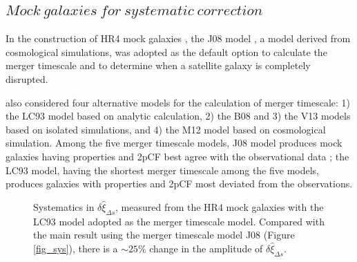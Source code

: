 \documentclass[iop]{emulateapj}
\begin{document}


\subsection{$Mock\ galaxies\ for\ systematic\ correction$}

In the construction of HR4 mock galaxies \citep{hong2016}, 
the J08 model \citep{jiang2008}, a model derived from cosmological simulations, 
was adopted as the default option to calculate the merger timescale and to determine when a satellite galaxy is completely disrupted.

\cite{hong2016} also considered four alternative models for the calculation of merger timescale:
1) the LC93 model \citep{LC93} based on analytic calculation, 
2) the B08 \citep{B08} and 3) the V13 \citep{V13} models based on isolated simulations,
and 4) the M12 model \citep{M12} based on cosmological simulation.
Among the five merger timescale models, 
J08 model produces mock galaxies having properties and 2pCF best agree with the observational data \citep{hong2016};
the LC93 model, having the shortest merger timescale among the five models,
produces galaxies with properties and 2pCF most deviated from the observations.


\begin{figure}
   \caption{\label{fig_sys_LC93}
   Systematics in $\delta \hat \xi_{\Delta s}$, measured from the HR4 mock galaxies
   with the LC93 model adopted as the merger timescale model.
   Compared with the main result using the merger timescale model J08 (Figure \ref{fig_sys}), 
   there is a $\sim 25\%$ change in the amplitude of $\delta \hat \xi_{\Delta s}$.
   }
\end{figure}
\end{document}
